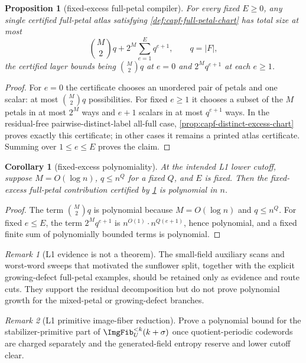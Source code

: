 \documentclass[11pt]{article}
\newtheorem{proposition}[proposition]{Proposition}
\newtheorem{corollary}[corollary]{Corollary}
\theoremstyle{definition}
\theoremstyle{remark}
\newtheorem{remark}[remark]{Remark}
\begin{document}
\begin{proposition}[fixed-excess full-petal compiler]\label{prop:capf-fixed-excess}
For every fixed $E\ge0$, any single certified full-petal atlas satisfying \cref{def:capf-full-petal-chart} has total size at most
\[
        \binom M2 q + 2^M\sum_{e=1}^{E}q^{e+1},
        \qquad q=|F| ,
\]
the certified layer bounds being $\binom M2q$ at $e=0$ and $2^Mq^{e+1}$ at each $e\ge1$.
\end{proposition}

\begin{proof}
For $e=0$ the certificate chooses an unordered pair of petals and one scalar: at most $\binom M2q$ possibilities.  For fixed $e\ge1$ it chooses a subset of the $M$ petals in at most $2^M$ ways and $e+1$ scalars in at most $q^{e+1}$ ways.  In the residual-free pairwise-distinct-label all-full case, \cref{prop:capf-distinct-excess-chart} proves exactly this certificate; in other cases it remains a printed atlas certificate.  Summing over $1\le e\le E$ proves the claim.
\end{proof}

\begin{corollary}[fixed-excess polynomiality]\label{cor:capf-fixed-excess-poly}
At the intended L1 lower cutoff, suppose $M=O(\log n)$, $q\le n^Q$ for a fixed $Q$, and $E$ is fixed.  Then the fixed-excess full-petal contribution certified by \cref{prop:capf-fixed-excess} is polynomial in $n$.
\end{corollary}

\begin{proof}
The term $\binom M2q$ is polynomial because $M=O(\log n)$ and $q\le n^Q$.  For fixed $e\le E$, the term $2^Mq^{e+1}$ is $n^{O(1)}\cdot n^{Q(e+1)}$, hence polynomial, and a fixed finite sum of polynomially bounded terms is polynomial.
\end{proof}

\begin{remark}[L1 evidence is not a theorem]\label{rem:capf-l1-evidence}
The small-field auxiliary scans and worst-word sweeps that motivated the sunflower split, together with the explicit growing-defect full-petal examples, should be retained only as evidence and route cuts.  They support the residual decomposition but do not prove polynomial growth for the mixed-petal or growing-defect branches.
\end{remark}

\begin{remark}[L1 primitive image-fiber reduction]\label{prob:capf-primitive-image-fiber}
Prove a polynomial bound for the stabilizer-primitive part of $\ImgFib_U^{<k}(k+\sigma)$ once quotient-periodic codewords are charged separately and the generated-field entropy reserve and lower cutoff clear.
\end{remark}
\end{document}
